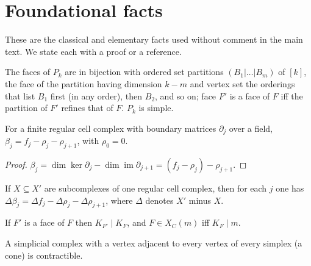 \chapter{Foundational facts}\label{app:lemmas}
These are the classical and elementary facts used without comment in the main text. We state each with a proof or a reference.

\begin{proposition}\label{prop:faces}
The faces of $P_k$ are in bijection with ordered set partitions $(B_1|\dots|B_m)$ of $[k]$, the face of the partition having dimension $k-m$ and vertex set the orderings that list $B_1$ first (in any order), then $B_2$, and so on; face $F'$ is a face of $F$ iff the partition of $F'$ refines that of $F$. $P_k$ is simple.
\end{proposition}

\begin{proposition}\label{prop:ranknull}
For a finite regular cell complex with boundary matrices $\partial_j$ over a field, $\beta_j=f_j-\rho_j-\rho_{j+1}$, with $\rho_0=0$.
\end{proposition}
\begin{proof}
$\beta_j=\dim\ker\partial_j-\dim\operatorname{im}\partial_{j+1}=(f_j-\rho_j)-\rho_{j+1}$.
\end{proof}

\begin{proposition}\label{prop:diff}
If $X\subseteq X'$ are subcomplexes of one regular cell complex, then for each $j$ one has $\Delta\beta_j=\Delta f_j-\Delta\rho_j-\Delta\rho_{j+1}$, where $\Delta$ denotes $X'$ minus $X$.
\end{proposition}

\begin{lemma}\label{lem:lcmdiv}
If $F'$ is a face of $F$ then $K_{F'}\mid K_F$, and $F\in X_C(m)$ iff $K_F\mid m$.
\end{lemma}

\begin{lemma}\label{lem:cone}
A simplicial complex with a vertex adjacent to every vertex of every simplex (a cone) is contractible.
\end{lemma}

